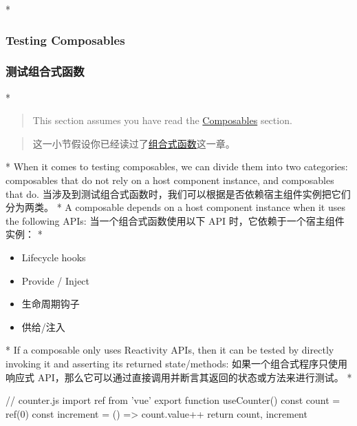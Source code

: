 \begin{paracol}{2}
 
\switchcolumn[0]*%
\subsubsection{Testing Composables}
\switchcolumn
\subsubsection{测试组合式函数}
\switchcolumn[0]*%
\begin{quote}
This section assumes you have read the
\href{https://vuejs.org/guide/reusability/composables.html}{Composables}
section.
\end{quote}
\switchcolumn
\begin{quote}
这一小节假设你已经读过了\href{https://cn.vuejs.org/guide/reusability/composables.html}{组合式函数}这一章。
\end{quote}
\switchcolumn[0]*%
When it comes to testing composables, we can divide them into two
categories: composables that do not rely on a host component instance,
and composables that do.
\switchcolumn
当涉及到测试组合式函数时，我们可以根据是否依赖宿主组件实例把它们分为两类。
\switchcolumn[0]*%
A composable depends on a host component instance when it uses the
following APIs:
\switchcolumn
当一个组合式函数使用以下 API 时，它依赖于一个宿主组件实例：
\switchcolumn[0]*%
\begin{itemize}
\item
  Lifecycle hooks
\item
  Provide / Inject
\end{itemize}
\switchcolumn
\begin{itemize}
\item
  生命周期钩子
\item
  供给/注入
\end{itemize}
\switchcolumn[0]*%
If a composable only uses Reactivity APIs, then it can be tested by
directly invoking it and asserting its returned state/methods:
\switchcolumn
如果一个组合式程序只使用响应式
API，那么它可以通过直接调用并断言其返回的状态或方法来进行测试。
\switchcolumn[0]*%
\begin{codeJs}
// counter.js
import { ref } from 'vue'
export function useCounter() {
  const count = ref(0)
  const increment = () => count.value++
  return {
    count,
    increment
  }
}
\end{codeJs}
\switchcolumn
\begin{codeJs}

\end{codeJs}
\end{paracol}
